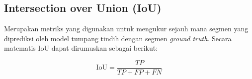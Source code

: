 




\subsection{Intersection over Union (IoU)}
\noindent Merupakan metriks yang digunakan untuk mengukur sejauh mana segmen yang diprediksi oleh model tumpang tindih dengan segmen \textit{ground truth}\cite{jiang_iu-net_2023}. Secara matematis IoU dapat dirumuskan sebagai berikut:

\begin{equation}
	\text{IoU} = \frac{TP}{TP + FP + FN}
\end{equation}

